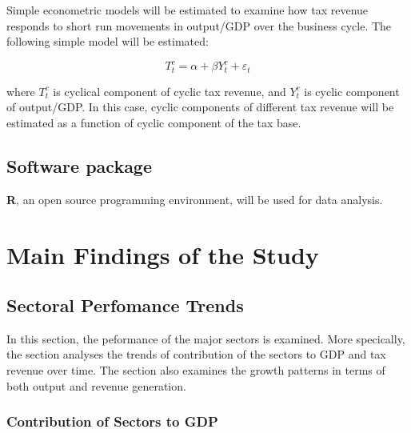 \documentclass[12pt,a4paper,final]{article}
\begin{document}
Simple econometric models will be estimated to examine how tax revenue responds to short run movements in output/GDP over the business cycle. The following simple model will be estimated:

\[ T_t^c = \alpha + \beta Y_t^c + \varepsilon_t \]

where $T_t^c$ is cyclical component of cyclic tax revenue, and $Y_t^c$ is cyclic component of output/GDP. In this case, cyclic components of different tax revenue will be estimated as a function of cyclic component of the tax base.

\subsection{Software package}
\textbf{R}, an open source programming environment,  will be used for data analysis. 

\section{Main Findings of the Study}

\subsection{Sectoral Perfomance Trends}

In this section, the peformance of the major sectors is examined.  More specically, the section analyses the trends of contribution of the sectors to GDP and tax revenue over time.  The section also examines the growth patterns in terms of both output and revenue generation.

\newpage
\subsubsection{Contribution of Sectors to GDP}
\end{document}
